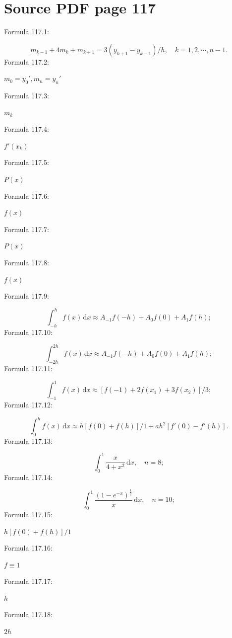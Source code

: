 \documentclass[11pt]{article}
\begin{document}
\section*{Source PDF page 117}
\noindent Formula 117.1:\par
\[
m_{k-1}+4m_k+m_{k+1}=3(y_{k+1}-y_{k-1})/h,\quad k=1,2,\cdots,n-1.
\tag{4.5.7}
\]
\noindent Formula 117.2:\par
$m_0=y_0',m_n=y_n'$\par
\noindent Formula 117.3:\par
$m_k$\par
\noindent Formula 117.4:\par
$f'(x_k)$\par
\noindent Formula 117.5:\par
$P(x)$\par
\noindent Formula 117.6:\par
$f(x)$\par
\noindent Formula 117.7:\par
$P(x)$\par
\noindent Formula 117.8:\par
$f(x)$\par
\noindent Formula 117.9:\par
\[
\int_{-h}^{h}f(x)\,\mathrm{d}x\approx A_{-1}f(-h)+A_0f(0)+A_1f(h);
\]
\noindent Formula 117.10:\par
\[
\int_{-2h}^{2h}f(x)\,\mathrm{d}x\approx A_{-1}f(-h)+A_0f(0)+A_1f(h);
\]
\noindent Formula 117.11:\par
\[
\int_{-1}^{1}f(x)\,\mathrm{d}x\approx[f(-1)+2f(x_1)+3f(x_2)]/3;
\]
\noindent Formula 117.12:\par
\[
\int_0^h f(x)\,\mathrm{d}x\approx h[f(0)+f(h)]/1+ah^2[f'(0)-f'(h)].
\]
\noindent Formula 117.13:\par
\[
\int_0^1\frac{x}{4+x^2}\,\mathrm{d}x,\quad n=8;
\]
\noindent Formula 117.14:\par
\[
\int_0^1\frac{(1-e^{-x})^{\frac12}}{x}\,\mathrm{d}x,\quad n=10;
\]
\noindent Formula 117.15:\par
$h[f(0)+f(h)]/1$\par
\noindent Formula 117.16:\par
$f\equiv1$\par
\noindent Formula 117.17:\par
$h$\par
\noindent Formula 117.18:\par
$2h$\par
\clearpage
\end{document}
